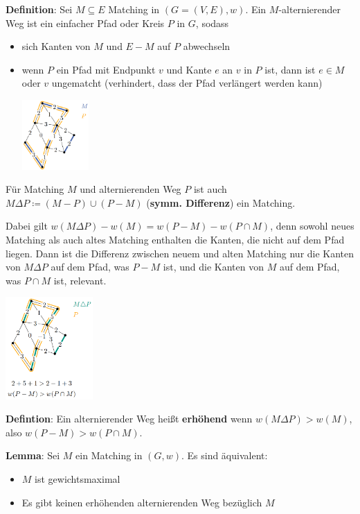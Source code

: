 \bigskip
\textbf{Definition}: Sei $M\subseteq E$ Matching in $(G = (V, E), w)$. Ein $M$-alternierender Weg ist ein einfacher Pfad oder Kreis $P$ in $G$, sodass
\begin{itemize}
	\item sich Kanten von $M$ und $E- M$ auf $P$ abwechseln
	\item wenn $P$ ein Pfad mit Endpunkt $v$ und Kante $e$ an $v$ in $P$ ist, dann ist $e\in M$ oder $v$ ungematcht (verhindert, dass der Pfad verlängert werden kann)
	\begin{center}
		\includegraphics[width=0.2\textwidth]{images/alternating-path.png}
	\end{center}
\end{itemize}
Für Matching $M$ und alternierenden Weg $P$ ist auch $M\Delta P\coloneqq (M- P)\cup(P- M)$ (\textbf{symm. Differenz}) ein Matching.

Dabei gilt $w(M\Delta P)-w(M)=w(P- M)-w(P\cap M)$, denn sowohl neues Matching als auch altes Matching enthalten die Kanten, die nicht auf dem Pfad liegen. Dann ist die Differenz zwischen neuem und alten Matching nur die Kanten von $M\Delta P$ auf dem Pfad, was $P-M$ ist, und die Kanten von $M$ auf dem Pfad, was $P\cap M$ ist, relevant.

\begin{center}
	\includegraphics[width=0.25\textwidth]{images/sym-diff.png}
\end{center}
\bigskip
\textbf{Defintion}: Ein alternierender Weg heißt \textbf{erhöhend} wenn $w(M\Delta P)>w(M)$, also $w(P-M)>w(P\cap M)$.\\
\pagebreak

\textbf{Lemma}: Sei $M$ ein Matching in $(G, w)$. Es sind äquivalent:
\begin{itemize}
	\item $M$ ist gewichtsmaximal
	\item Es gibt keinen erhöhenden alternierenden Weg bezüglich $M$
\end{itemize}

